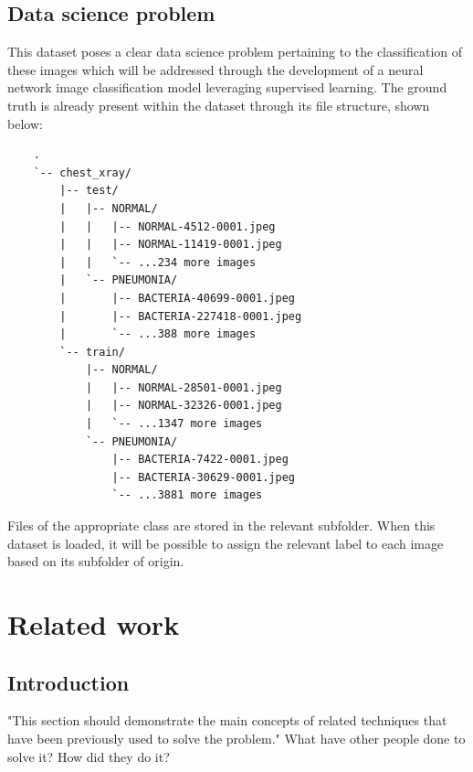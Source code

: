 \documentclass[12pt]{report}
\newcommand{\para}{\vspace{7pt}\noindent}
\begin{document}


\section{Data science problem}
This dataset poses a clear data science problem pertaining to the classification of these images which will be addressed through the 
development of a neural network image classification model leveraging supervised learning. The ground truth is already present within  
the dataset through its file structure, shown below:

\begin{verbatim}
    .
    `-- chest_xray/
        |-- test/
        |   |-- NORMAL/
        |   |   |-- NORMAL-4512-0001.jpeg
        |   |   |-- NORMAL-11419-0001.jpeg
        |   |   `-- ...234 more images
        |   `-- PNEUMONIA/
        |       |-- BACTERIA-40699-0001.jpeg
        |       |-- BACTERIA-227418-0001.jpeg
        |       `-- ...388 more images
        `-- train/
            |-- NORMAL/
            |   |-- NORMAL-28501-0001.jpeg
            |   |-- NORMAL-32326-0001.jpeg
            |   `-- ...1347 more images
            `-- PNEUMONIA/
                |-- BACTERIA-7422-0001.jpeg
                |-- BACTERIA-30629-0001.jpeg
                `-- ...3881 more images
\end{verbatim}

\noindent Files of the appropriate class are stored in the relevant subfolder. When this dataset is loaded, it will be possible to 
assign the relevant label to each image based on its subfolder of origin.




\chapter{Related work}


\section{Introduction}
"This section should demonstrate the main concepts
of related techniques that have been previously used to solve the problem."
\para What have other people done to solve it? How did they do it? 
\end{document}
